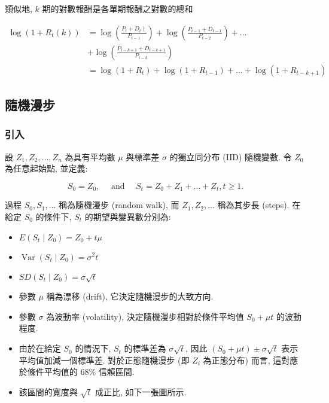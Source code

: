 \documentclass[letterpaper]{article}
\begin{document}
		
		類似地, $k$ 期的對數報酬是各單期報酬之對數的總和
		
		$$
		\begin{aligned}
			\log \left (1+R_{t} (k) \right) & =\log \left (\frac{\left.P_{t}+D_{t}\right) }{P_{t-1}}\right) +\log \left (\frac{P_{t-1}+D_{t-1}}{P_{t-2}}\right) +\ldots \\
			& +\log \left (\frac{P_{t-k+1}+D_{t-k+1}}{P_{t-k}}\right) \\
			& =\log \left (1+R_{t}\right) +\log \left (1+R_{t-1}\right) +\ldots+\log \left (1+R_{t-k+1}\right) 
		\end{aligned}
		$$
		
		\subsection{隨機漫步}
		\subsubsection{引入}
		設 \( Z_{1}, Z_{2}, \ldots, Z_{n} \) 為具有平均數 \(\mu\) 與標準差 \(\sigma\) 的獨立同分布 (IID) 隨機變數. 令 \( Z_{0} \) 為任意起始點, 並定義: 
		
		$$
		S_{0}=Z_{0}, \quad \text { and } \quad S_{t}=Z_{0}+Z_{1}+\ldots+Z_{t}, t \geq 1 .
		$$
		
		過程 \( S_{0}, S_{1}, \ldots \) 稱為隨機漫步 (random walk), 而 \( Z_{1}, Z_{2}, \ldots \) 稱為其步長 (steps). 
		在給定 \( S_{0} \) 的條件下, \( S_{t} \) 的期望與變異數分別為: 
		
		\begin{itemize}
			\item $E\left (S_{t} \mid Z_{0}\right) =Z_{0}+t \mu$
			\item $\operatorname{Var}\left (S_{t} \mid Z_{0}\right) =\sigma^{2} t$
			\item $S D\left (S_{t} \mid Z_{0}\right) =\sigma \sqrt{t}$
		\end{itemize}
		
		\begin{itemize}
			\item 參數 \(\mu\) 稱為漂移 (drift), 它決定隨機漫步的大致方向. 
			\item 參數 \(\sigma\) 為波動率 (volatility), 決定隨機漫步相對於條件平均值 \( S_{0} + \mu t \) 的波動程度. 
			\item 由於在給定 \( S_{0} \) 的情況下, \( S_{t} \) 的標準差為 \(\sigma \sqrt{t}\), 因此 \( (S_{0} + \mu t) \pm \sigma \sqrt{t}\) 表示平均值加減一個標準差. 對於正態隨機漫步 (即 \( Z_i \) 為正態分布) 而言, 這對應於條件平均值的 68\% 信賴區間. 
			\item 該區間的寬度與 \(\sqrt{t}\) 成正比, 如下一張圖所示. 
		\end{itemize}
		
\end{document}
